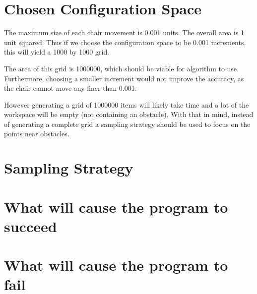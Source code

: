 \documentclass[12pt]{article}
\begin{document}
    \maketitle

    \section{Chosen Configuration Space}

    The maximum size of each chair movement is 0.001 units. The overall area is 1 unit squared. Thus if we choose the configuration space to be 0.001 increments, this will yield a 1000 by 1000 grid. 
    
    The area of this grid is 1000000, which should be viable for algorithm to use. Furthermore, choosing a smaller increment would not improve the accuracy, as the chair cannot move any finer than 0.001.
    
    However generating a grid of 1000000 items will likely take time and a lot of the workspace will be empty (not containing an obstacle). With that in mind, instead of generating a complete grid a sampling strategy should be used to focus on the points near obstacles.


    \section{Sampling Strategy}

    \section{What will cause the program to succeed}

    \section{What will cause the program to fail}
\end{document}
